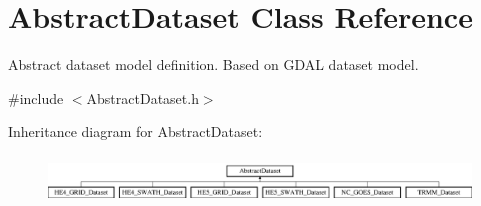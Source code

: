 \hypertarget{classAbstractDataset}{
\section{AbstractDataset Class Reference}
\label{classAbstractDataset}
}


Abstract dataset model definition. Based on GDAL dataset model.  




{\ttfamily \#include $<$AbstractDataset.h$>$}

Inheritance diagram for AbstractDataset:\begin{figure}[H]
\begin{center}
\leavevmode
\includegraphics[height=1.296296cm]{classAbstractDataset}
\end{center}
\end{figure}
